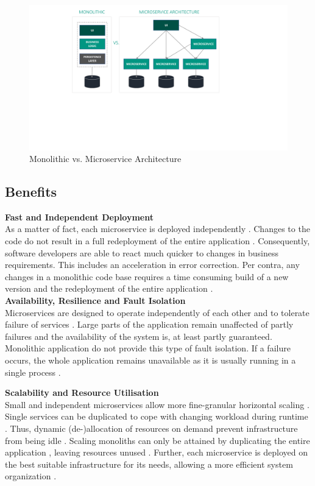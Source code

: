 \begin{figure}[]
	\includegraphics[width=\textwidth, trim={5cm 8cm 8cm 3cm}]{img/Architektur.pdf}
	\caption{Monolithic vs. Microservice Architecture}
	\label{fig:architekturMonolithVsMS}
\end{figure}


\subsection{Benefits}
\textbf{Fast and Independent Deployment} \\
As a matter of fact, each microservice is deployed independently \cite{interfaceAnalysisBaresi}. Changes to the code do not result in a full redeployment of the entire application \cite{FunctionalDecompositionHeinrich}. Consequently, software developers are able to react much quicker to changes in business requirements. This includes an acceleration in error correction. Per contra, any changes in a monolithic code base requires a time consuming build of a new version and the redeployment of the entire application \cite{Fowler}. \\

\noindent
\textbf{Availability, Resilience and Fault Isolation} \\
Microservices are designed to operate independently of each other and to tolerate failure of services \cite{Fowler}. Large parts of the application remain unaffected of partly failures and the availability of the system is, at least partly guaranteed. Monolithic application do not provide this type of fault isolation. If a failure occurs, the whole application remains unavailable as it is usually running in a single process \cite{ExtractionMazlami}. 
 
\noindent
\textbf{Scalability and Resource Utilisation} \\
Small and independent microservices allow more fine-granular horizontal scaling \cite{WorkloadbasedClustering}. Single services can be duplicated to cope with changing workload during runtime \cite{DataflowDrivenChen}. Thus, dynamic (de-)allocation of resources on demand prevent infrastructure from being idle \cite{HeuristicsAlwis}. Scaling monoliths can only be attained by duplicating the entire application , leaving resources unused \cite{ClassificationOfRefactoring}. Further, each microservice is deployed on the best suitable infrastructure for its needs, allowing a more efficient system organization \cite{infoq}. \\

